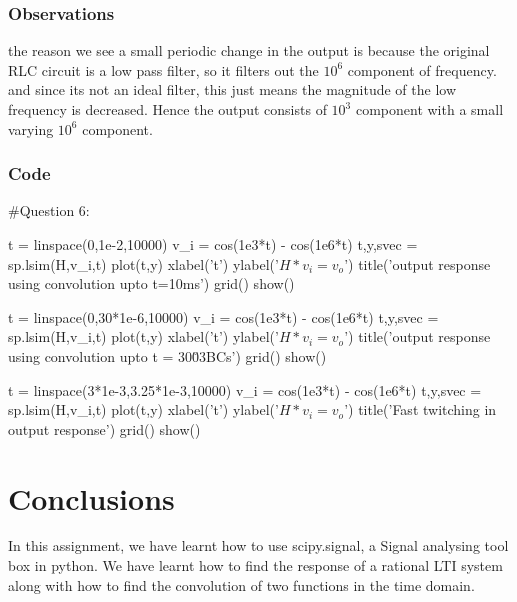 \documentclass[11pt]{article}
\begin{document}
\subsubsection{Observations}
the reason we see a small periodic change in the output is because the original RLC circuit is a low pass filter, so it filters out the $10^6$ component of frequency. and since its not an ideal filter, this just means the magnitude of the low frequency is decreased. Hence the output consists of $10^3$ component with a small varying $10^6$ component.

\subsubsection{Code}
\begin{python}
#Question 6:

t = linspace(0,1e-2,10000)
v_i = cos(1e3*t) - cos(1e6*t)
t,y,svec = sp.lsim(H,v_i,t)
plot(t,y)
xlabel('t')
ylabel('$H * v_i = v_o$')
title('output response using convolution upto t=10ms')
grid()
show()

t = linspace(0,30*1e-6,10000)
v_i = cos(1e3*t) - cos(1e6*t)
t,y,svec = sp.lsim(H,v_i,t)
plot(t,y)
xlabel('t')
ylabel('$H * v_i = v_o$')
title('output response using convolution upto t = 30\u03BCs')
grid()
show()


t = linspace(3*1e-3,3.25*1e-3,10000)
v_i = cos(1e3*t) - cos(1e6*t)
t,y,svec = sp.lsim(H,v_i,t)
plot(t,y)
xlabel('t')
ylabel('$H * v_i = v_o$')
title('Fast twitching in output response')
grid()
show()
\end{python}

\section{Conclusions}
In this assignment, we have learnt how to use scipy.signal, a Signal analysing tool box in python. We have learnt how to find the response of a rational LTI system along with how to find the convolution of two functions in the time domain.
\end{document}
